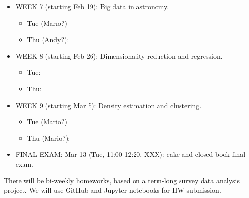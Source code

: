 \documentclass[10pt]{article}
\begin{document}
\begin{itemize}
\item WEEK  7 (starting Feb 19):   Big data in astronomy.
\begin{itemize}
\item Tue (Mario?): 
\item Thu (Andy?): 
\end{itemize}     

\item WEEK  8 (starting Feb 26): Dimensionality reduction and regression.
\begin{itemize}
\item Tue: 
\item Thu: 
\end{itemize}     

\item WEEK  9 (starting Mar 5):  Density estimation and clustering.
\begin{itemize}
\item Tue (Mario?):  
\item Thu (Mario?):  
\end{itemize}     

\item FINAL EXAM: Mar 13 (Tue, 11:00-12:20, XXX): cake and closed book final exam.

\end{itemize}


\vskip 0.2in


There will be bi-weekly homeworks, based on a term-long survey data analysis project.
We will use GitHub and Jupyter notebooks for HW submission. 
\end{document}
